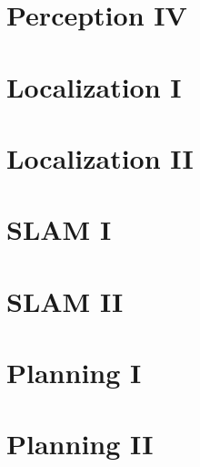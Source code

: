 \documentclass[landscape]{article}
\begin{document}
\begin{multicols}{3}
\blindtext[3]

\section{Perception IV}

\blindtext[3]

\section{Localization I}

\blindtext[3]

\section{Localization II}

\blindtext[3]

\section{SLAM I}

\blindtext[3]

\section{SLAM II}

\blindtext[3]

\section{Planning I}

\blindtext[3]

\section{Planning II}

\blindtext[3]





\end{multicols}
\end{document}
